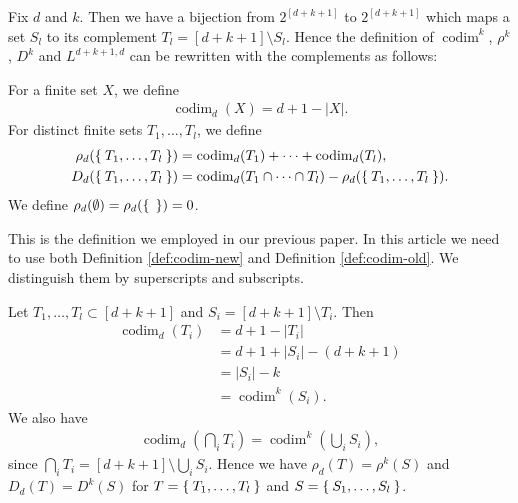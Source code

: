 \documentclass{wstmp}
\begin{document}
Fix $d$ and $k$. 
Then we have a bijection from $2^{[d+k+1]}$ to $2^{[d+k+1]}$ 
which maps 
a set $S_l$ to its complement $T_l=[d+k+1]\setminus S_l$.
Hence the definition of 
${\operatorname{codim}}^k$,
$\rho^k$,
$D^k$
and
$L^{d+k+1,d}$
can be rewritten with the complements as follows:
\begin{definition}
\label{def:codim-old}
For a finite set  $X$, 
we define 
\begin{align*}
{\operatorname{codim}}_d(X) = d+1-{\left|{X}\right|}.
\end{align*}
For distinct finite sets $T_1,\ldots, T_l$,
we define 
\begin{align*}
\rho_d(\Set{T_1,\ldots,T_l})
&= {\operatorname{codim}}_d (T_1) +\cdots+{\operatorname{codim}}_d (T_l),\\
D_d(\Set{T_1,\ldots,T_l})
&={\operatorname{codim}}_d(T_1\cap\cdots\cap T_l)-\rho_d(\Set{T_1,\ldots,T_l}).
\end{align*}
We define $\rho_d(\emptyset)=\rho_d(\Set{ }) = 0$.
\end{definition}
This is the definition we employed in our previous paper\cite{1009.3676}.
In this article we need to use both Definition \ref{def:codim-new}
and Definition \ref{def:codim-old}. We distinguish them by 
superscripts and subscripts.

\begin{remark}
Let $T_1,\ldots,T_l \subset [d+k+1]$ and $S_i=[d+k+1] \setminus T_i$.
Then 
\begin{align*}
{\operatorname{codim}}_d (T_i) 
&=d+1 -{\left|{T_i}\right|}\\ 
&=d+1+{\left|{S_i}\right|}-(d+k+1)\\
&={\left|{S_i}\right|}-k\\
&={\operatorname{codim}}^k(S_i).
\end{align*}
We also have
\begin{align*}
{\operatorname{codim}}_d(\bigcap_i T_i)={\operatorname{codim}}^k(\bigcup_i S_i),
\end{align*}
since $\bigcap_i T_i=[d+k+1]\setminus \bigcup_i S_i$.
Hence we have
$\rho_d(T)=\rho^k(S)$ and
$D_d(T)=D^k(S)$ for $T=\Set{T_1,\ldots,T_l}$
and $S=\Set{S_1,\ldots,S_l}$.
\end{remark}
\end{document}

